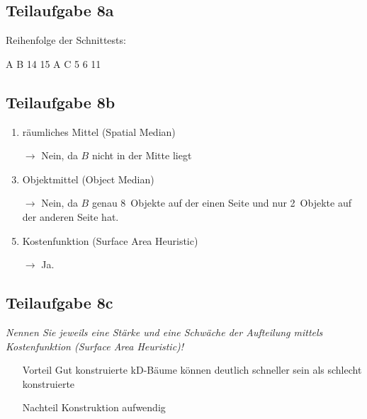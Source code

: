 \documentclass[a4paper]{scrartcl}
\begin{document}
\subsection*{Teilaufgabe 8a}

Reihenfolge der Schnittests:

A B 14 15 A C 5 6 11

\subsection*{Teilaufgabe 8b}
\begin{enumerate}
    \item räumliches Mittel (Spatial Median)
    \item[$\rightarrow$] Nein, da $B$ nicht in der Mitte liegt
    \item Objektmittel (Object Median)
    \item[$\rightarrow$] Nein, da $B$ genau 8~Objekte auf der einen Seite und
                         nur 2~Objekte auf der anderen Seite hat.
    \item Kostenfunktion (Surface Area Heuristic)
    \item[$\rightarrow$] Ja.
\end{enumerate}

\subsection*{Teilaufgabe 8c}
\textit{Nennen Sie jeweils eine Stärke und eine Schwäche der Aufteilung mittels Kostenfunktion (Surface Area Heuristic)!}

\begin{itemize}
    \item[Vorteil] Gut konstruierte kD-Bäume können deutlich schneller sein als schlecht konstruierte
    \item[Nachteil] Konstruktion aufwendig
\end{itemize}
\end{document}
